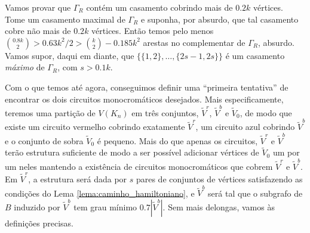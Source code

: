 Vamos provar que $\Gamma_R$ contém um casamento cobrindo mais de $0.2k$ vértices. Tome um casamento maximal de $\Gamma_R$ e suponha, por absurdo, que tal casamento cobre não mais de $0.2k$ vértices. Então temos pelo menos $\binom{0.8k}{2}> 0.63k^2/2 > \binom{k}{2} - 0.185k^2$ arestas no complementar de $\Gamma_R$, absurdo. Vamos supor, daqui em diante, que $\{\{1,2\}, \dots, \{2s-1, 2s\}\}$ é um casamento \emph{máximo} de $\Gamma_R$, com $s > 0.1k$.


Com o que temos até agora, conseguimos definir uma ``primeira tentativa'' de encontrar os dois circuitos monocromáticos desejados. Mais especificamente, teremos uma partição de $V(K_n)$ em três conjuntos, $\tilde{V}^r$, $\tilde{V}^b$ e $\tilde{V}_0$, de modo que existe um circuito vermelho cobrindo exatamente $\tilde{V}^r$, um circuito azul cobrindo $\tilde{V}^b$ e o conjunto de sobra $\tilde{V}_0$ é pequeno. Mais do que apenas os circuitos, $\tilde{V}^r$ e $\tilde{V}^b$ terão estrutura suficiente de modo a ser possível adicionar vértices de $\tilde{V}_0$ um por um neles mantendo a existência de circuitos monocromáticos que cobrem $\tilde{V}^r$ e $\tilde{V}^b$. Em $\tilde{V}^r$, a estrutura será dada por $s$ pares de conjuntos de vértices satisfazendo as condições do Lema \ref{lema:caminho_hamiltoniano}, e $\tilde{V}^b$ será tal que o subgrafo de $B$ induzido por $\tilde{V}^b$ tem grau mínimo $0.7|\tilde{V}^b|$. Sem mais delongas, vamos às definições precisas.

